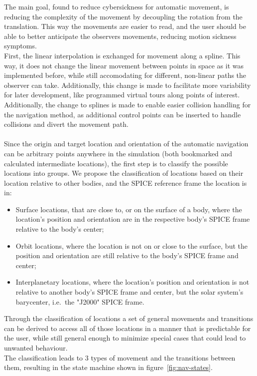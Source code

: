 The main goal, found to reduce cybersickness for automatic movement, is reducing the complexity of the movement by
decoupling the rotation from the translation.
This way the movements are easier to read, and the user should be able to better anticipate the observers movements,
reducing motion sickness symptoms.
\\
First, the linear interpolation is exchanged for movement along a spline.
This way, it does not change the linear movement between points in space as it was implemented before, while still
accomodating for different, non-linear paths the observer can take.
Additionally, this change is made to facilitate more variability for later development, like programmed virtual tours
along points of interest.
Additionally, the change to splines is made to enable easier collision handling for the navigation method, as
additional control points can be inserted to handle collisions and divert the movement path.
\\
\\
Since the origin and target location and orientation of the automatic navigation can be arbitrary points anywhere in
the simulation (both bookmarked and calculated intermediate locations), the first step is to classify the possible
locations into groups.
We propose the classification of locations based on their location relative to other bodies, and the SPICE reference
frame the location is in:
\begin{itemize}
    \item Surface locations, that are close to, or on the surface of a body, where the location's position and
    orientation are in the respective body's SPICE frame relative to the body's center;
    \item Orbit locations, where the location is not on or close to the surface, but the position and orientation
    are still relative to the body's SPICE frame and center;
    \item Interplanetary locations, where the location's position and orientation is not relative to another body's
    SPICE frame and center, but the solar system's barycenter, i.e.\ the "J2000" SPICE frame.
\end{itemize}
Through the classification of locations a set of general movements and transitions can be derived to access all of
those locations in a manner that is predictable for the user, while still general enough to minimize special cases
that could lead to unwanted behaviour.
\\
The classification leads to 3 types of movement and the transitions between them, resulting in the state machine
shown in figure~\ref{fig:nav-states}.


